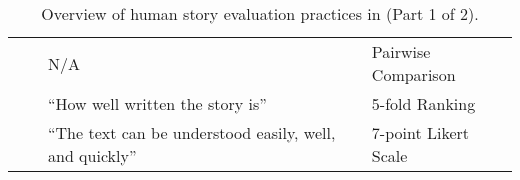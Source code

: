 {\begin{landscape}
\begin{table}
\begin{tabular}{llll}
                & \citet{bai2021semantics} & N/A & Pairwise Comparison \\
                & \citet{wilmot2021temporal} & ``How well written the story is'' & 5-fold Ranking \\
                & \citet{pascual-etal-2021-plug-play} & ``The text can be understood easily, well, and quickly'' & 7-point Likert Scale \\
                \bottomrule
            \end{tabular}
            \caption{Overview of human story evaluation practices in {\asg} (Part 1 of 2).}
            \label{tab:overview_criteria_1}
        \end{table}
    \end{landscape}
    
    \clearpage
    
}
